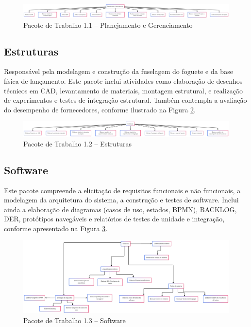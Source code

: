 \begin{figure}[!h]
	\centering
\includegraphics[width=15cm]{figuras/eap_planejamento.png}
	\caption{Pacote de Trabalho 1.1 – Planejamento e Gerenciamento}
	\label{fig_eap_planejamento} 
\end{figure}

\subsection{Estruturas}

Responsável pela modelagem e construção da fuselagem do foguete e da base física de lançamento. Este pacote inclui atividades como elaboração de desenhos técnicos em CAD, levantamento de materiais, montagem estrutural, e realização de experimentos e testes de integração estrutural. Também contempla a avaliação do desempenho de fornecedores, conforme ilustrado na Figura \ref{fig_eap_estruturas}.

\begin{figure}[!h]
	\centering
\includegraphics[width=15cm]{figuras/eap_estruturas.png}
	\caption{Pacote de Trabalho 1.2 – Estruturas}
	\label{fig_eap_estruturas} 
\end{figure}

\subsection{Software}

Este pacote compreende a elicitação de requisitos funcionais e não funcionais, a modelagem da arquitetura do sistema, a construção e testes de software. Inclui ainda a elaboração de diagramas (casos de uso, estados, BPMN), BACKLOG, DER, protótipos navegáveis e relatórios de testes de unidade e integração, conforme apresentado na Figura \ref{fig_eap_software}.


\begin{figure}[!h]
	\centering
\includegraphics[width=15cm]{figuras/eap_software.png}
	\caption{Pacote de Trabalho 1.3 – Software}
	\label{fig_eap_software} 
\end{figure}

